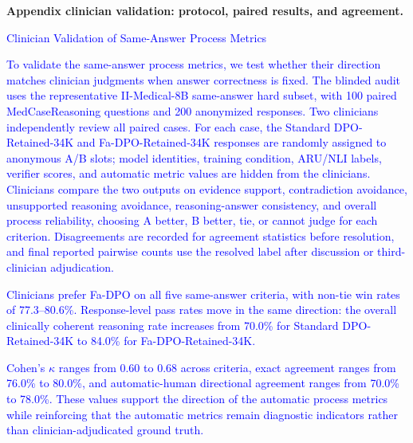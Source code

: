 \documentclass[12pt]{article}
\newcommand{\added}[1]{\textcolor{blue}{#1}}
\begin{document}
\textbf{Appendix clinician validation: protocol, paired results, and agreement.}
\begin{displayquote}
\added{Clinician Validation of Same-Answer Process Metrics}

\added{To validate the same-answer process metrics, we test whether their direction matches clinician judgments when answer correctness is fixed. The blinded audit uses the representative II-Medical-8B same-answer hard subset, with 100 paired MedCaseReasoning questions and 200 anonymized responses. Two clinicians independently review all paired cases. For each case, the Standard DPO-Retained-34K and Fa-DPO-Retained-34K responses are randomly assigned to anonymous A/B slots; model identities, training condition, ARU/NLI labels, verifier scores, and automatic metric values are hidden from the clinicians. Clinicians compare the two outputs on evidence support, contradiction avoidance, unsupported reasoning avoidance, reasoning-answer consistency, and overall process reliability, choosing A better, B better, tie, or cannot judge for each criterion. Disagreements are recorded for agreement statistics before resolution, and final reported pairwise counts use the resolved label after discussion or third-clinician adjudication.}

\added{Clinicians prefer Fa-DPO on all five same-answer criteria, with non-tie win rates of 77.3--80.6\%. Response-level pass rates move in the same direction: the overall clinically coherent reasoning rate increases from 70.0\% for Standard DPO-Retained-34K to 84.0\% for Fa-DPO-Retained-34K.}

\added{Cohen's $\kappa$ ranges from 0.60 to 0.68 across criteria, exact agreement ranges from 76.0\% to 80.0\%, and automatic-human directional agreement ranges from 70.0\% to 78.0\%. These values support the direction of the automatic process metrics while reinforcing that the automatic metrics remain diagnostic indicators rather than clinician-adjudicated ground truth.}
\end{displayquote}
\end{document}
